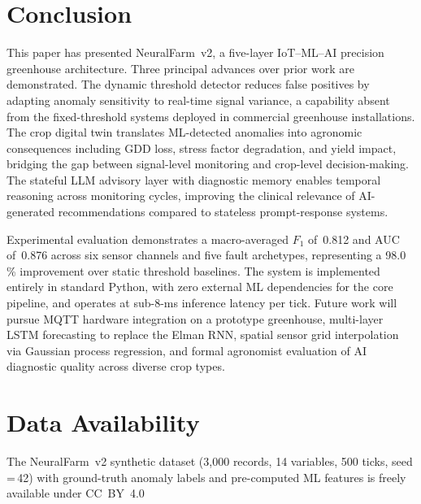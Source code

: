 \documentclass[journal,10pt,twocolumn]{IEEEtran}
\begin{document}
\section{Conclusion}
\label{sec:conclusion}

This paper has presented NeuralFarm~v2, a five-layer IoT--ML--AI
precision greenhouse architecture.
Three principal advances over prior work are demonstrated.
The dynamic threshold detector reduces false positives by adapting
anomaly sensitivity to real-time signal variance, a capability absent
from the fixed-threshold systems deployed in commercial greenhouse
installations.
The crop digital twin translates ML-detected anomalies into agronomic
consequences including GDD loss, stress factor degradation, and yield
impact, bridging the gap between signal-level monitoring and
crop-level decision-making.
The stateful LLM advisory layer with diagnostic memory enables
temporal reasoning across monitoring cycles, improving the clinical
relevance of AI-generated recommendations compared to stateless
prompt-response systems.

Experimental evaluation demonstrates a macro-averaged $F_1$ of~0.812
and AUC of~0.876 across six sensor channels and five fault archetypes,
representing a 98.0\,\% improvement over static threshold baselines.
The system is implemented entirely in standard Python, with zero
external ML dependencies for the core pipeline, and operates at
sub-8-ms inference latency per tick.
Future work will pursue MQTT hardware integration on a prototype
greenhouse, multi-layer LSTM forecasting to replace the Elman RNN,
spatial sensor grid interpolation via Gaussian process regression, and
formal agronomist evaluation of AI diagnostic quality across diverse
crop types.

\section*{Data Availability}

The NeuralFarm~v2 synthetic dataset (3{,}000 records, 14 variables,
500 ticks, seed\,=\,42) with ground-truth anomaly labels and
pre-computed ML features is freely available under CC~BY~4.0

\balance
\end{document}
